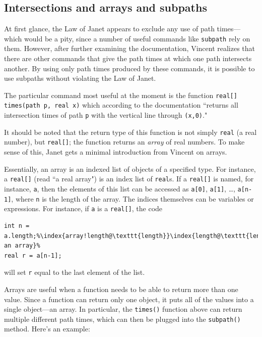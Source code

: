 \documentclass{article}
\begin{document}
\subsection{Intersections and arrays and subpaths}
At first glance, the Law of Janet appears to exclude any use of path times---which would be 
a pity, since a number of useful commands like \verb;subpath; rely on them.  However, 
after further examining the documentation, Vincent realizes that there are other commands that 
give the path times at which one path intersects another.  By using only path times produced 
by these commands, it is possible to use subpaths without violating the Law of Janet.

The particular command most useful at the moment is 
the function \lstinline!real[] times(path p, real x)! which 
according to the documentation ``returns all intersection times of path \verb;p; with the vertical 
line through \verb;(x,0);."

It should be noted that the return type 
of this function is not simply \verb;real; (a real number), but 
\verb;real[];; 
the function returns an \emph{array} of real numbers.  To make sense of this, Janet gets a 
minimal introduction from Vincent on arrays.

Essentially, an array
is an indexed list of objects of a specified type.  For instance, a \verb;real[]; (read 
``a real array") is an index list of \verb;real;s.  If a \verb;real[]; is named, for instance, \verb;a;, then 
the elements of this list can be accessed as \verb;a[0];, \verb;a[1];, \ldots, \lstinline;a[n-1];, where \lstinline;n; 
is the length of the array.  The indices 
themselves can be variables or expressions.  For instance, 
if \lstinline;a; is a \lstinline;real[];, the code 
\begin{lstlisting}[escapechar=\%]
int n = a.length;%\index{array!length@\texttt{length}}\index{length@\texttt{length}!of an array}%
real r = a[n-1];
\end{lstlisting}
will set \verb;r; equal to the last element of the list.

Arrays are useful when a function needs to be able to return more than one value.  Since a function 
can return only one object, it puts all of the values into a single object---an array.  In particular, the 
\lstinline;times(); function above 
can return multiple different path times, which can then be plugged into 
the \lstinline;subpath(); method.  Here's an example:
\end{document}
